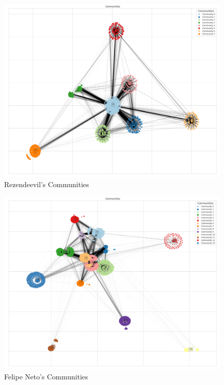 \documentclass[sigconf]{acmart}
\begin{document}
\begin{figure}[t]
    \centering
    \includegraphics[keepaspectratio,width=\linewidth]{./imgs/rezendeevil/communities.png}
    \caption[width=\textwidth]{Rezendeevil's Communities}
    \label{fig:rezendeevil_comm}
\end{figure}

\begin{figure}[t]
    \centering
    \includegraphics[keepaspectratio,width=\linewidth]{./imgs/felipeneto/communities.png}
    \caption[width=\textwidth]{Felipe Neto's Communities}
    \label{fig:felipeneto_comm}
\end{figure}
\end{document}
